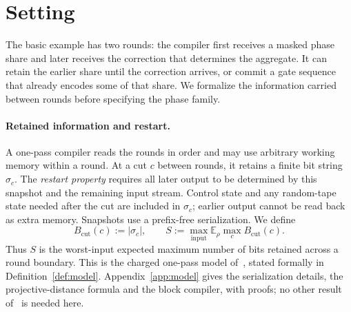 \documentclass[aps,prx,twocolumn,superscriptaddress,nofootinbib,longbibliography]{revtex4-2}
\theoremstyle{plain}
\theoremstyle{definition}
\theoremstyle{remark}
\newcommand{\E}{\mathbb{E}}
\begin{document}
\section{Setting}\label{sec:setting}

The basic example has two rounds: the compiler first receives a masked phase share and later receives the correction that determines the aggregate. It can retain the earlier share until the correction arrives, or commit a gate sequence that already encodes some of that share. We formalize the information carried between rounds before specifying the phase family.

\paragraph{Retained information and restart.} A one-pass compiler reads the rounds in order and may use arbitrary working memory within a round. At a cut $c$ between rounds, it retains a finite bit string $\sigma_c$. The \emph{restart property} requires all later output to be determined by this snapshot and the remaining input stream. Control state and any random-tape state needed after the cut are included in $\sigma_c$; earlier output cannot be read back as extra memory. Snapshots use a prefix-free serialization. We define
\begin{equation}\label{eq:memory}
B_{\mathrm{cut}}(c):=|\sigma_c|,\qquad
S:=\max_{\mathrm{input}}\E_\rho\max_cB_{\mathrm{cut}}(c).
\end{equation}
Thus $S$ is the worst-input expected maximum number of bits retained across a round boundary. This is the charged one-pass model of~\cite{Paper1}, stated formally in Definition~\ref{def:model}. Appendix~\ref{app:model} gives the serialization details, the projective-distance formula and the block compiler, with proofs; no other result of~\cite{Paper1} is needed here.
\end{document}
